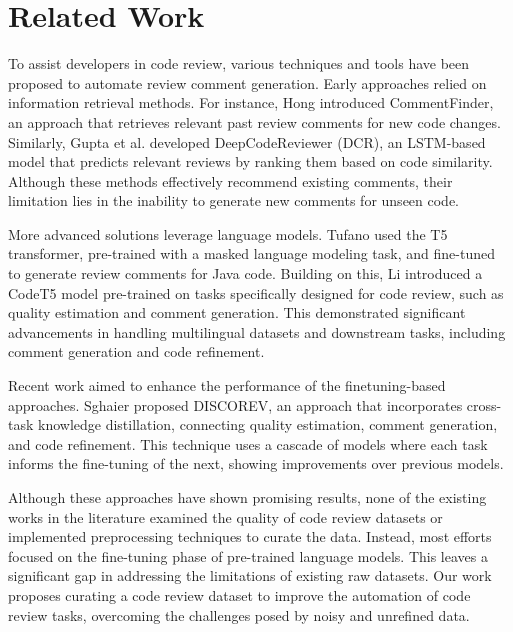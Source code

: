 \section{Related Work}
\label{sec:related}

To assist developers in code review, various techniques and tools have been proposed to automate review comment generation.
Early approaches relied on information retrieval methods. For instance, Hong \etal \cite{hong2022commentfinder} introduced CommentFinder, an approach that retrieves relevant past review comments for new code changes. Similarly, Gupta et al. \cite{gupta2018intelligent} developed DeepCodeReviewer (DCR), an LSTM-based model that predicts relevant reviews by ranking them based on code similarity. Although these methods effectively recommend existing comments, their limitation lies in the inability to generate new comments for unseen code.


More advanced solutions leverage language models. Tufano \etal \cite{tufan2021towards, tufano2022using} used the T5 transformer, pre-trained with a masked language modeling task, and fine-tuned to generate review comments for Java code. Building on this, Li \etal \cite{li2022automating} introduced a CodeT5 model pre-trained on tasks specifically designed for code review, such as quality estimation and comment generation. This demonstrated significant advancements in handling multilingual datasets and downstream tasks, including comment generation and code refinement.


Recent work aimed to enhance the performance of the finetuning-based approaches. Sghaier \etal \cite{sghaier2024improving} proposed DISCOREV, an approach that incorporates cross-task knowledge distillation, connecting quality estimation, comment generation, and code refinement. This technique uses a cascade of models where each task informs the fine-tuning of the next, showing improvements over previous models.


Although these approaches have shown promising results, none of the existing works in the literature examined the quality of code review datasets or implemented preprocessing techniques to curate the data. Instead, most efforts focused on the fine-tuning phase of pre-trained language models. This leaves a significant gap in addressing the limitations of existing raw datasets. Our work proposes curating a code review dataset to improve the automation of code review tasks, overcoming the challenges posed by noisy and unrefined data.









